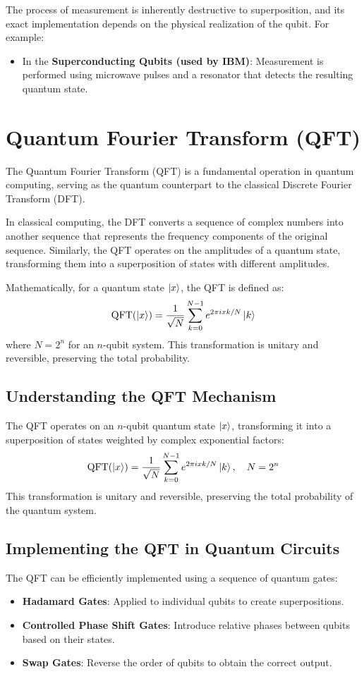 \documentclass{article}
\begin{document}
The process of measurement is inherently destructive to superposition, and its exact implementation depends on the physical realization of the qubit. For example:

\begin{itemize}
    \item In the \textbf{Superconducting Qubits (used by IBM)}: Measurement is performed using microwave pulses and a resonator that detects the resulting quantum state.
\end{itemize}


\section{Quantum Fourier Transform (QFT)}

The Quantum Fourier Transform (QFT) is a fundamental operation in quantum computing, serving as the quantum counterpart to the classical Discrete Fourier Transform (DFT).

In classical computing, the DFT converts a sequence of complex numbers into another sequence that represents the frequency components of the original sequence. Similarly, the QFT operates on the amplitudes of a quantum state, transforming them into a superposition of states with different amplitudes.

Mathematically, for a quantum state $\ket{x}$, the QFT is defined as:
\[
    \text{QFT}(\ket{x}) = \frac{1}{\sqrt{N}} \sum_{k=0}^{N-1} e^{2\pi i xk / N} \ket{k}
\]
where $N = 2^n$ for an $n$-qubit system. This transformation is unitary and reversible, preserving the total probability.

\subsection{Understanding the QFT Mechanism}

The QFT operates on an $n$-qubit quantum state $\ket{x}$, transforming it into a superposition of states weighted by complex exponential factors:
\[
    \text{QFT}(\ket{x}) = \frac{1}{\sqrt{N}} \sum_{k=0}^{N-1} e^{2\pi i xk / N} \ket{k}, \quad N = 2^n
\]
This transformation is unitary and reversible, preserving the total probability of the quantum system.

\subsection{Implementing the QFT in Quantum Circuits}

The QFT can be efficiently implemented using a sequence of quantum gates:
\begin{itemize}
    \item \textbf{Hadamard Gates}: Applied to individual qubits to create superpositions.
    \item \textbf{Controlled Phase Shift Gates}: Introduce relative phases between qubits based on their states.
    \item \textbf{Swap Gates}: Reverse the order of qubits to obtain the correct output.
\end{itemize}
\end{document}

